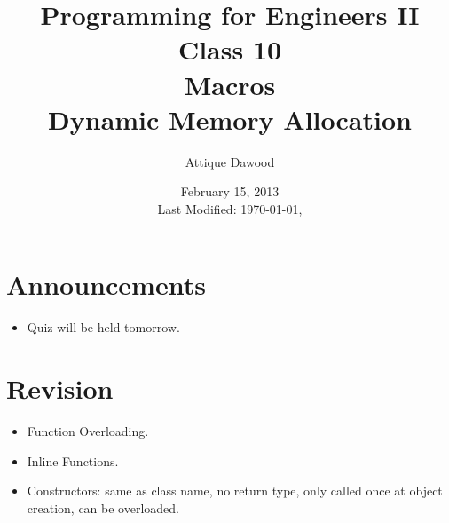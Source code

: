 \documentclass[12pt,a4paper]{article}
\title{\vspace{-2cm}Programming for Engineers II\\Class 10\\Macros\\Dynamic Memory Allocation}
\author{Attique Dawood}
\date{February 15, 2013\\[0.2cm] Last Modified: \today, \currenttime}
\begin{document}
\maketitle
\section{Announcements}
\begin{itemize}
\item Quiz will be held tomorrow.
\end{itemize}
\section{Revision}
\begin{itemize}
\item Function Overloading.
\item Inline Functions.
\item Constructors: same as class name, no return type, only called once at object creation, can be overloaded.
\end{itemize}
\end{document}
